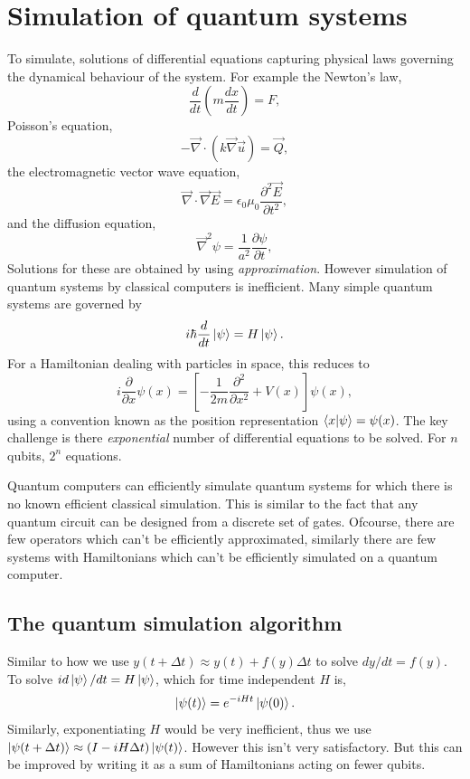 \section{Simulation of quantum systems}
To simulate, solutions of differential equations capturing physical laws governing the dynamical behaviour of the system. For example the Newton's law,
\begin{equation}
    \frac{d}{dt}\left(m\frac{dx}{dt}\right) = F,
\end{equation}
Poisson's equation,
\begin{equation}
    -\Vec{\nabla}\cdot(k\Vec{\nabla}\Vec{u}) = \Vec{Q},
\end{equation}
the electromagnetic vector wave equation,
\begin{equation}
    \Vec{\nabla}\cdot\Vec{\nabla}\Vec{E} = \epsilon_0\mu_0\frac{\partial^2\Vec{E}}{\partial t^2},
\end{equation}
and the diffusion equation,
\begin{equation}
    \Vec{\nabla}^2\psi = \frac{1}{a^2} \frac{\partial \psi}{\partial t},
\end{equation}
Solutions for these are obtained by using \textit{approximation}. However simulation of quantum systems by classical computers is inefficient. Many simple quantum systems are governed by
\begin{equation}
    i\hbar\frac{d}{dt}\ket{\psi} = H\ket{\psi}.
\end{equation}
For a Hamiltonian dealing with particles in space, this reduces to
\begin{equation}
    i\frac{\partial}{\partial x}\psi(x) = \left[-\frac{1}{2m}\frac{\partial^2}{\partial x^2} + V(x)\right] \psi(x),
\end{equation}
using a convention known as the position representation $\braket{x|\psi} = \psi(x)$. The key challenge is there \textit{exponential} number of differential equations to be solved. For $n$ qubits, $2^n$ equations.

Quantum computers can efficiently simulate quantum systems for which there is no known efficient classical simulation. This is similar to the fact that any quantum circuit can be designed from a discrete set of gates. Ofcourse, there are few operators which can't be efficiently approximated, similarly there are few systems with Hamiltonians which can't be efficiently simulated on a quantum computer.

\subsection{The quantum simulation algorithm}
Similar to how we use $y(t+\Delta t) \approx y(t)+f(y)\Delta t$ to solve $dy/dt=f(y)$. To solve $id\ket{\psi}/dt = H\ket{\psi}$, which for time independent $H$ is,
\begin{equation}
    \ket{\psi(t)} = e^{-iHt}\ket{\psi(0)}.
\end{equation}
Similarly, exponentiating $H$ would be very inefficient, thus we use $\ket{\psi(t+\Delta t)}
\approx (I-iH\Delta t)\ket{\psi(t)}$. However this isn't very satisfactory. But this can be improved by writing it as a sum of Hamiltonians acting on fewer qubits.

